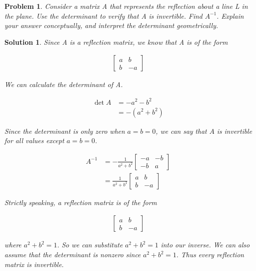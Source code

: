 \documentclass{article}
\newtheorem{problem}{Problem}
\newtheorem*{solution}{Solution}
\begin{document}
\begin{problem}
Consider a matrix A that represents the reflection about a line L in the plane. Use the determinant to verify that A is invertible. Find $A^{-1}$. Explain your answer conceptually, and interpret the determinant geometrically.
\end{problem}

\begin{solution}
Since A is a reflection matrix, we know that A is of the form

\begin{align*}
\begin{bmatrix}
a & b \\ b & -a
\end{bmatrix}
\end{align*}

We can calculate the determinant of A.

\begin{align*}
\det A &= -a^2 - b^2 \\
&= -(a^2 + b^2)
\end{align*}

Since the determinant is only zero when $a = b = 0$, we can say that $A$ is invertible for all values except $a = b = 0$.

\begin{align*}
A^{-1} &= \displaystyle -\frac{1}{a^2+b^2} \begin{bmatrix}-a & -b \\ -b & a \end{bmatrix} \\
&= \displaystyle \frac{1}{a^2+b^2} \begin{bmatrix}a & b \\ b & -a \end{bmatrix}
\end{align*}

Strictly speaking, a reflection matrix is of the form 

\begin{align*}
\begin{bmatrix}a & b \\ b & -a\end{bmatrix}
\end{align*}

where $a^2 + b^2 = 1$. So we can substitute $a^2+b^2 = 1$ into our inverse. We can also assume that the determinant is nonzero since $a^2+b^2 = 1$. Thus every reflection matrix is invertible.


\end{solution}
\end{document}
